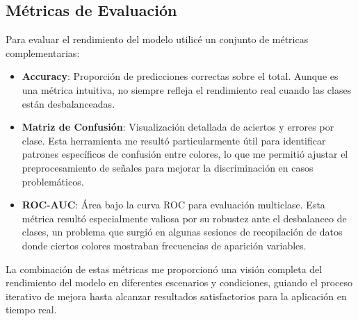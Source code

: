 \subsection{Métricas de Evaluación}
Para evaluar el rendimiento del modelo utilicé un conjunto de métricas complementarias:
\begin{itemize}
    \item \textbf{Accuracy}: Proporción de predicciones correctas sobre el total. Aunque es una métrica intuitiva, no siempre refleja el rendimiento real cuando las clases están desbalanceadas.
    
    \item \textbf{Matriz de Confusión}: Visualización detallada de aciertos y errores por clase. Esta herramienta me resultó particularmente útil para identificar patrones específicos de confusión entre colores, lo que me permitió ajustar el preprocesamiento de señales para mejorar la discriminación en casos problemáticos.
    
    \item \textbf{ROC-AUC}: Área bajo la curva ROC para evaluación multiclase. Esta métrica resultó especialmente valiosa por su robustez ante el desbalanceo de clases, un problema que surgió en algunas sesiones de recopilación de datos donde ciertos colores mostraban frecuencias de aparición variables.
\end{itemize}

La combinación de estas métricas me proporcionó una visión completa del rendimiento del modelo en diferentes escenarios y condiciones, guiando el proceso iterativo de mejora hasta alcanzar resultados satisfactorios para la aplicación en tiempo real.